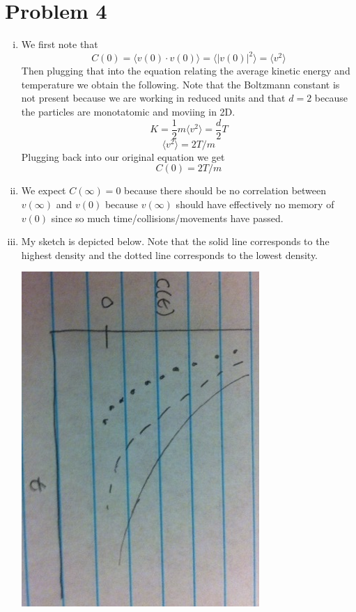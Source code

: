 \documentclass{article}
\begin{document}
\section*{Problem 4}
\begin{enumerate}[i.]
  \item We first note that
    $$C(0) = \langle v(0) \cdot v(0) \rangle = \langle |v(0)|^2 \rangle = \langle v^2 \rangle$$
    Then plugging that into the equation relating the average kinetic energy and temperature we obtain the following. Note that the Boltzmann constant is not present because we are working in reduced units and that $d=2$ because the particles are monotatomic and moviing in 2D.
    $$K = \frac{1}{2} m \langle v^2 \rangle = \frac{d}{2} T$$
    $$ \langle v^2 \rangle = 2T / m$$
    Plugging back into our original equation we get
    $$C(0) = 2T / m$$

  \item We expect $C(\infty) = 0$ because there should be no correlation between $v(\infty)$ and $v(0)$ because $v(\infty)$ should have effectively no memory of $v(0)$ since so much time/collisions/movements have passed.

  \item My sketch is depicted below. Note that the solid line corresponds to the highest density and the dotted line corresponds to the lowest density.
    \begin{center}
      \includegraphics[scale=0.7]{4iii}
    \end{center}


\end{enumerate}
\end{document}
